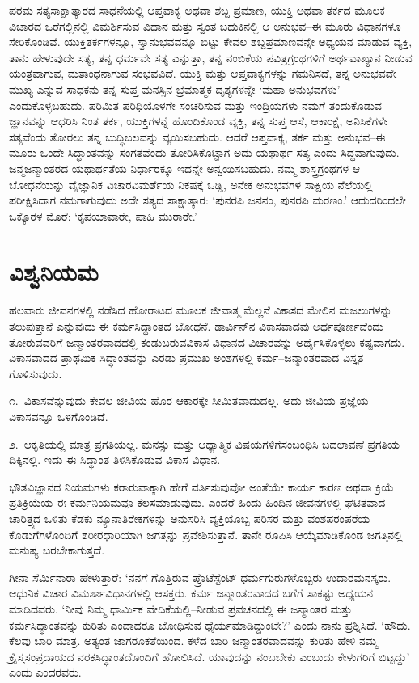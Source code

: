 ಪರಮ ಸತ್ಯಸಾಕ್ಷಾತ್ಕಾರದ ಸಾಧನೆಯಲ್ಲಿ ಆಪ್ತವಾಕ್ಯ ಅಥವಾ ಶಬ್ದ ಪ್ರಮಾಣ, ಯುಕ್ತಿ ಅಥವಾ ತರ್ಕದ ಮೂಲಕ ವಿಚಾರದ ಒರೆಗಲ್ಲಿನಲ್ಲಿ ವಿಮರ್ಶಿಸುವ ವಿಧಾನ ಮತ್ತು ಸ್ವಂತ ಬದುಕಿನಲ್ಲಿ ಆ ಅನುಭವ–ಈ ಮೂರು ವಿಧಾನಗಳೂ ಸೇರಿಕೊಂಡಿವೆ. ಯುಕ್ತಿತರ್ಕಗಳನ್ನೂ, ಸ್ವಾನುಭವವನ್ನೂ ಬಿಟ್ಟು ಕೇವಲ ಶಬ್ದಪ್ರಮಾಣವನ್ನೇ ಅಧ್ಯಯನ ಮಾಡುವ ವ್ಯಕ್ತಿ, ತಾನು ಹೇಳುವುದೇ ಸತ್ಯ, ತನ್ನ ಧರ್ಮವೇ ಸತ್ಯ ಎನ್ನುತ್ತಾ, ತನ್ನ ನಂಬಿಕೆಯ ಪವಿತ್ರಗ್ರಂಥಗಳಿಗೆ ಅರ್ಥವಾಖ್ಯಾನ ನೀಡುವ ಯಂತ್ರವಾಗುವ, ಮತಾಂಧನಾಗುವ ಸಂಭವವಿದೆ. ಯುಕ್ತಿ ಮತ್ತು ಆಪ್ತವಾಕ್ಯಗಳನ್ನು ಗಮನಿಸದೆ, ತನ್ನ ಅನುಭವವೇ ಮುಖ್ಯ ಎನ್ನುವ ಸಾಧಕನು ತನ್ನ ಸುಪ್ತ ಮನಸ್ಸಿನ ಭ್ರಮಾತ್ಮಕ ದೃಶ್ಯಗಳನ್ನೇ ‘ಮಹಾ ಅನುಭವಗಳು’ ಎಂದುಕೊಳ್ಳಬಹುದು. ಪರಿಮಿತ ಪರಿಧಿಯೊಳಗೇ ಸಂಚರಿಸುವ ಮತ್ತು ಇಂದ್ರಿಯಗಳು ನಮಗೆ ತಂದುಕೊಡುವ ಜ್ಞಾನವನ್ನು ಆಧರಿಸಿ ನಿಂತ ತರ್ಕ, ಯುಕ್ತಿಗಳನ್ನೆ ಹೊಂದಿಕೊಂಡ ವ್ಯಕ್ತಿ, ತನ್ನ ಸುಪ್ತ ಆಸೆ, ಆಕಾಂಕ್ಷೆ, ಅನಿಸಿಕೆಗಳೇ ಸತ್ಯವೆಂದು ತೋರಲು ತನ್ನ ಬುದ್ಧಿಬಲವನ್ನು ವ್ಯಯಿಸಬಹುದು. ಆದರೆ ಆಪ್ತವಾಕ್ಯ, ತರ್ಕ ಮತ್ತು ಅನುಭವ–ಈ ಮೂರು ಒಂದೇ ಸಿದ್ಧಾಂತವನ್ನು ಸಂಗತವೆಂದು ತೋರಿಸಿಕೊಟ್ಟಾಗ ಅದು ಯಥಾರ್ಥ ಸತ್ಯ ಎಂದು ಸಿದ್ಧವಾಗುವುದು. ಜನ್ಮಜನ್ಮಾಂತರದ ಯಥಾರ್ಥತೆಯ ನಿರ್ಧಾರಕ್ಕೂ ಇದನ್ನೇ ಅನ್ವಯಿಸಬಹುದು. ನಮ್ಮ ಶಾಸ್ತ್ರಗ್ರಂಥಗಳ ಆ ಬೋಧನೆಯನ್ನು ವೈಜ್ಞಾನಿಕ ವಿಚಾರವಿಮರ್ಶೆಯ ನಿಕಷಕ್ಕೆ ಒಡ್ಡಿ, ಅನೇಕ ಅನುಭವಗಳ ಸಾಕ್ಷಿಯ ನೆಲೆಯಲ್ಲಿ ಪರೀಕ್ಷಿಸಿದಾಗ ನಮಗಾಗುವುದು ಅದೇ ಸತ್ಯದ ಸಾಕ್ಷಾತ್ಕಾರ: ‘ಪುನರಪಿ ಜನನಂ, ಪುನರಪಿ ಮರಣಂ.’ ಆದುದರಿಂದಲೇ ಒಕ್ಕೊರಳ ಮೊರೆ: ‘ಕೃಪಯಾವಾರೇ, ಪಾಹಿ ಮುರಾರೇ.’


\section*{ವಿಶ್ವನಿಯಮ}


ಹಲವಾರು ಜೀವನಗಳಲ್ಲಿ ನಡೆಸಿದ ಹೋರಾಟದ ಮೂಲಕ ಜೀವಾತ್ಮ ಮೆಲ್ಲನೆ ವಿಕಾಸದ ಮೇಲಿನ ಮಜಲುಗಳನ್ನು ತಲುಪುತ್ತಾನೆ ಎನ್ನುವುದು ಈ ಕರ್ಮಸಿದ್ಧಾಂತದ ಬೋಧನೆ. ಡಾರ್ವಿನ್​ನ ವಿಕಾಸವಾದವು ಅರ್ಥಪೂರ್ಣವೆಂದು ತೋರುವವರಿಗೆ ಜನ್ಮಾಂತರವಾದದಲ್ಲಿ ಕಂಡುಬರುವ\break ವಿಕಾಸ ವಿಧಾನದ ವಿಚಾರವನ್ನು ಅರ್ಥೈಸಿಕೊಳ್ಳಲು ಕಷ್ಟವಾಗದು. ವಿಕಾಸವಾದದ ಪ್ರಾಥಮಿಕ ಸಿದ್ಧಾಂತವನ್ನು ಎರಡು ಪ್ರಮುಖ ಅಂಶಗಳಲ್ಲಿ ಕರ್ಮ–ಜನ್ಮಾಂತರವಾದ ವಿಸ್ತೃತ ಗೊಳಿಸುವುದು.

೧.\ ವಿಕಾಸವೆನ್ನುವುದು ಕೇವಲ ಜೀವಿಯ ಹೊರ ಆಕಾರಕ್ಕೇ ಸೀಮಿತವಾದುದಲ್ಲ. ಅದು ಜೀವಿಯ ಪ್ರಜ್ಞೆಯ ವಿಕಾಸವನ್ನೂ ಒಳಗೊಂಡಿದೆ.

೨.\ ಆಕೃತಿಯಲ್ಲಿ ಮಾತ್ರ ಪ್ರಗತಿಯಲ್ಲ. ಮನಸ್ಸು ಮತ್ತು ಆಧ್ಯಾತ್ಮಿಕ ವಿಷಯಗಳಿಗೆ\break ಸಂಬಂಧಿಸಿ ಬದಲಾವಣೆ ಪ್ರಗತಿಯ ದಿಕ್ಕಿನಲ್ಲಿ. ಇದು ಈ ಸಿದ್ಧಾಂತ ತಿಳಿಸಿಕೊಡುವ ವಿಕಾಸ ವಿಧಾನ.

ಭೌತವಿಜ್ಞಾನದ ನಿಯಮಗಳು ಕರಾರುವಾಕ್ಕಾಗಿ ಹೇಗೆ ವರ್ತಿಸುವುವೋ ಅಂತೆಯೇ ಕಾರ್ಯ ಕಾರಣ ಅಥವಾ ಕ್ರಿಯೆ ಪ್ರತಿಕ್ರಿಯೆಯ ಈ ಕರ್ಮನಿಯಮವೂ ಕೆಲಸಮಾಡುವುದು. ಎಂದರೆ ಹಿಂದು ಹಿಂದಿನ ಜೀವನಗಳಲ್ಲಿ ಘಟಿತವಾದ ಚಾರಿತ್ರ್ಯದ ಒಳಿತು ಕೆಡಕು ನ್ಯೂನಾತಿರೇಕಗಳನ್ನು ಅನುಸರಿಸಿ ವ್ಯಕ್ತಿಯೊಬ್ಬ ಪರಿಸರ ಮತ್ತು ವಂಶಪರಂಪರೆಯ ಕೊಡುಗೆಗಳೊಂದಿಗೆ ಶರೀರಧಾರಿಯಾಗಿ ಜಗತ್ತನ್ನು ಪ್ರವೇಶಿಸುತ್ತಾನೆ. ತಾನೇ ರೂಪಿಸಿ ಆಯ್ಕೆಮಾಡಿಕೊಂಡ ಜಗತ್ತಿನಲ್ಲಿ ಮನುಷ್ಯ ಬರಬೇಕಾಗುತ್ತದೆ.

ಗೀನಾ ಸೆರ್ಮಿನಾರಾ ಹೇಳುತ್ತಾರೆ: ‘ನನಗೆ ಗೊತ್ತಿರುವ ಪ್ರೊಟೆಸ್ಟೆಂಟ್ ಧರ್ಮಗುರು\-ಗಳೊ\-ಬ್ಬರು ಉದಾರಮನಸ್ಕರು. ಆಧುನಿಕ ವಿಚಾರ ವಿಮರ್ಶಾವಿಧಾನಗಳಲ್ಲಿ ಆಸಕ್ತರು. ಕರ್ಮ ಜನ್ಮಾಂತರವಾದದ ಬಗೆಗೆ ಸಾಕಷ್ಟು ಅಧ್ಯಯನ ಮಾಡಿದವರು. ‘ನೀವು ನಿಮ್ಮ ಧಾರ್ಮಿಕ ವೇದಿಕೆಯಲ್ಲಿ–ನೀಡುವ ಪ್ರವಚನದಲ್ಲಿ ಈ ಜನ್ಮಾಂತರ ಮತ್ತು ಕರ್ಮಸಿದ್ಧಾಂತವನ್ನು ಕುರಿತು ಎಂದಾದರೂ ಬೋಧಿಸುವ ಧೈರ್ಯಮಾಡಿದ್ದುಂಟೇ?’ ಎಂದು ನಾನು ಪ್ರಶ್ನಿಸಿದೆ. ‘ಹೌದು. ಕೆಲವು ಬಾರಿ ಮಾತ್ರ. ಅತ್ಯಂತ ಜಾಗರೂಕತೆಯಿಂದ. ಕಳೆದ ಬಾರಿ ಜನ್ಮಾಂತರವಾದವನ್ನು ಕುರಿತು ಹೇಳಿ ನಮ್ಮ ಕ್ರೈಸ್ತಸಂಪ್ರದಾಯದ ನರಕಸಿದ್ಧಾಂತದೊಂದಿಗೆ ಹೋಲಿಸಿದೆ. ಯಾವುದನ್ನು ನಂಬಬೇಕು ಎಂಬುದು ಕೇಳುಗರಿಗೆ ಬಿಟ್ಟದ್ದು’ ಎಂದು ಎಂದರವರು.


